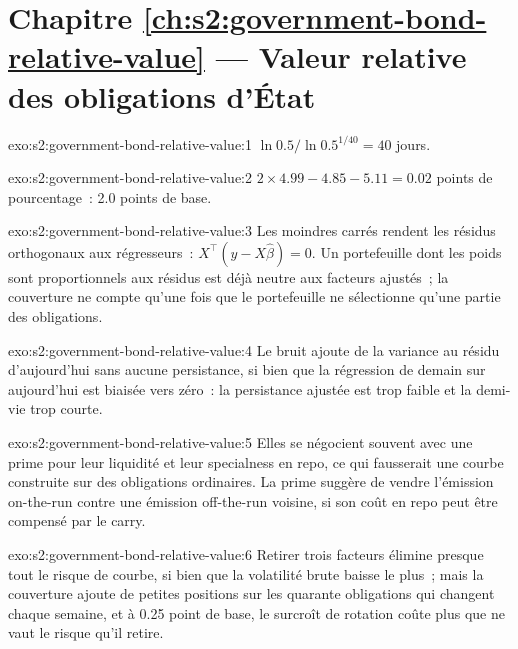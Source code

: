 \section*{Chapitre \ref{ch:s2:government-bond-relative-value} --- Valeur relative des obligations d'État}

\begin{solution}{exo:s2:government-bond-relative-value:1}
$\ln 0.5/\ln 0.5^{1/40} = 40$ jours.
\end{solution}

\begin{solution}{exo:s2:government-bond-relative-value:2}
$2 \times 4.99 - 4.85 - 5.11 = 0.02$ points de pourcentage~: 2.0 points de base.
\end{solution}

\begin{solution}{exo:s2:government-bond-relative-value:3}
Les moindres carrés rendent les résidus orthogonaux aux régresseurs~: $X^\top(y - X\hat\beta) = 0$. Un portefeuille dont les poids sont proportionnels aux résidus
est déjà neutre aux facteurs ajustés~; la couverture ne compte qu'une fois que le portefeuille ne sélectionne qu'une partie des obligations.
\end{solution}

\begin{solution}{exo:s2:government-bond-relative-value:4}
Le bruit ajoute de la variance au résidu d'aujourd'hui sans aucune persistance, si bien que la régression de demain sur aujourd'hui est biaisée vers zéro~: la
persistance ajustée est trop faible et la demi-vie trop courte.
\end{solution}

\begin{solution}{exo:s2:government-bond-relative-value:5}
Elles se négocient souvent avec une prime pour leur liquidité et leur specialness en repo, ce qui fausserait une courbe construite sur des obligations ordinaires. La prime
suggère de vendre l'émission on-the-run contre une émission off-the-run voisine, si son coût en repo peut être compensé par le carry.
\end{solution}

\begin{solution}{exo:s2:government-bond-relative-value:6}
Retirer trois facteurs élimine presque tout le risque de courbe, si bien que la volatilité brute baisse le plus~; mais la couverture ajoute de petites positions sur les quarante obligations qui
changent chaque semaine, et à 0.25 point de base, le surcroît de rotation coûte plus que ne vaut le risque qu'il retire.
\end{solution}

